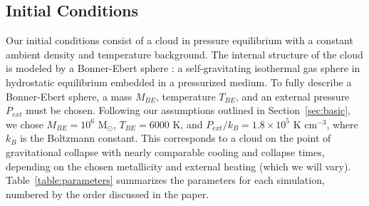 \documentclass[useAMS,usenatbib]{mn2e}
\newcommand{\msun}{{M$_\odot$}}
\begin{document}

\subsection{Initial Conditions}

Our initial conditions consist of a cloud in pressure equilibrium with a
constant ambient density and temperature background. The internal structure of the
cloud is modeled by a Bonner-Ebert sphere \citep{Bonnor1956}: a self-gravitating
isothermal gas sphere in hydrostatic equilibrium embedded in a pressurized  
medium. To fully describe a Bonner-Ebert sphere, a mass $M_{BE}$, temperature
$T_{BE}$, and an external pressure $P_{ext}$ must be chosen. Following our
assumptions outlined in Section~\ref{sec:basic}, we chose
$M_{BE}=10^6$ \msun, $T_{BE}=6000$ K, and $P_{ext}/k_B=1.8\times10^5$ K cm$^{-3}$, 
where $k_B$ is the Boltzmann constant. This corresponds to a cloud on the point of
gravitational collapse with nearly comparable cooling and collapse times,
depending on the chosen metallicity and external heating (which we will vary). Table~\ref{table:parameters}
summarizes the parameters for each simulation, numbered by the order discussed in the paper.
\end{document}
